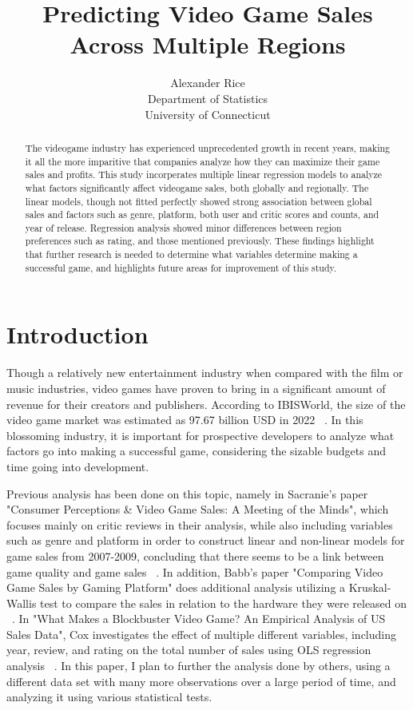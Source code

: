 \documentclass[12pt]{article}
\title{Predicting Video Game Sales Across Multiple Regions}
\author{Alexander Rice\\
  Department of Statistics\\
  University of Connecticut
}
\begin{document}
\maketitle

\begin{abstract}
The videogame industry has experienced unprecedented growth in recent years, making it all the more imparitive that companies analyze how they can maximize their game sales and profits.
This study incorperates multiple linear regression models to analyze what factors significantly affect videogame sales, both globally and regionally.
The linear models, though not fitted perfectly showed strong association between global sales and factors such as genre, platform, both user and critic scores and counts, and year of release.
Regression analysis showed minor differences between region preferences such as rating, and those mentioned previously. 
These findings highlight that further research is needed to determine what variables determine making a successful game, and highlights future areas for improvement of this study.

\end{abstract}


\section{Introduction}
\label{sec:intro}
Though a relatively new entertainment industry when compared with the film or music industries, video games have proven to bring in a 
significant amount of revenue for their creators and publishers. According to IBISWorld, the size of the video game market was estimated 
as 97.67 billion USD in 2022 ~\citep[(A)][]{Marketsizestat}.  In this blossoming industry, it is important for prospective developers 
to analyze what factors go into making a successful game, considering the sizable budgets and time going into development. 

Previous analysis has been done on this topic, namely in Sacranie's paper "Consumer Perceptions \& Video Game Sales: A Meeting of the Minds", 
which focuses mainly on critic reviews in their analysis, while also including variables such as genre and platform in order to construct 
linear and non-linear models for game sales from 2007-2009, concluding that there seems to be a link between game quality and game sales 
~\citep[(B)][]{Sacranie2010Analysis}. In addition, Babb's paper "Comparing Video Game Sales by Gaming Platform" does additional analysis 
utilizing a Kruskal-Wallis test to compare the sales in relation to the hardware they were released on ~\citep[(C)][]{Babb2013Analysis}. 
In "What Makes a Blockbuster Video Game? An Empirical Analysis of US Sales Data", Cox investigates the effect of multiple different variables,
including year, review, and rating on the total number of sales using OLS regression analysis ~\citep[(E)][]{Cox2013Analysis}.
In this paper, I plan to further the analysis done by others, using a different data set with many more observations over a large period 
of time, and analyzing it using various statistical tests.
\end{document}
